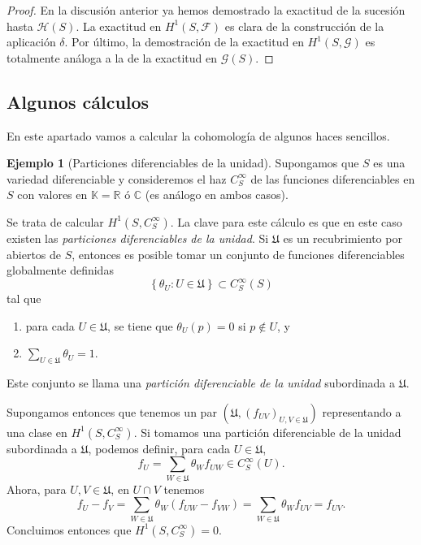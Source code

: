 \documentclass[12pt,a4paper]{article}
\theoremstyle{definition} \newtheorem{defn}[thm]{Definición}
\theoremstyle{definition} \newtheorem{ejemplo}[thm]{Ejemplo}
\theoremstyle{definition} \newtheorem{ejercicio}[thm]{Ejercicio}
\def\CC{\mathbb{C}}
\def\FF{\mathscr{F}}
\def\GG{\mathscr{G}}
\def\HH{\mathscr{H}}
\def\UU{\mathfrak{U}}
\begin{document}
\begin{proof}
  En la discusión anterior ya hemos demostrado la exactitud de la sucesión hasta $\HH(S)$. La exactitud en $H^1(S,\FF)$ es clara de la construcción de la aplicación $\delta$. Por último, la demostración de la exactitud en $H^1(S,\GG)$ es totalmente análoga a la de la exactitud en $\GG(S)$.
\end{proof}

\subsection{Algunos cálculos}
En este apartado vamos a calcular la cohomología de algunos haces sencillos.

\begin{ejemplo}[Particiones diferenciables de la unidad]
  Supongamos que $S$ es una variedad diferenciable y consideremos el haz $C^\infty_S$ de las funciones diferenciables en $S$ con valores en $\mathbb{K}=\mathbb{R}$ ó $\CC$ (es análogo en ambos casos).
  
  Se trata de calcular $H^1(S,C^\infty_S)$. La clave para este cálculo es que en este caso existen las \emph{particiones diferenciables de la unidad}. Si $\mathfrak{U}$ es un recubrimiento por abiertos de $S$, entonces es posible tomar un conjunto de funciones diferenciables globalmente definidas $$\left\{ \theta_U : U \in \mathfrak{U} \right\}  \subset C^{\infty}_S(S)$$
  tal que
  \begin{enumerate}
    \item para cada $U\in \mathfrak{U}$, se tiene que $\theta_U(p)=0$ si $p\not \in U$, y
    \item $\sum_{U\in \mathfrak{U}} \theta_U = 1$.
  \end{enumerate}
  Este conjunto se llama una \emph{partición diferenciable de la unidad} subordinada a $\UU$.

  Supongamos entonces que tenemos un par $(\mathfrak{U},(f_{UV})_{U,V\in \UU})$ representando a una clase en $H^1(S,C^\infty_S)$. Si tomamos una partición diferenciable de la unidad subordinada a $\UU$, podemos definir, para cada $U\in \UU$,
  \begin{equation*}
    f_U = \sum_{W\in \UU} \theta_W f_{UW} \in C^\infty_S(U).
  \end{equation*}
  Ahora, para $U,V \in \UU$, en $U\cap V$ tenemos
  \begin{equation*}
    f_U - f_V = \sum_{W\in \UU} \theta_W (f_{UW} - f_{VW}) = \sum_{W\in \UU} \theta_W f_{UV} = f_{UV}.
  \end{equation*}
  Concluimos entonces que $H^1(S,C^\infty_S)=0$.


\end{ejemplo}
\end{document}

